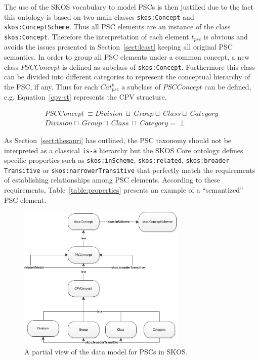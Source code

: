 \begin{itemize}
 The use of the SKOS vocabulary to model PSCs is then justified due to the fact this ontology is based on two 
 main classes \texttt{skos:Concept} and \texttt{skos:ConceptScheme}. Thus all PSC elements are 
 an instance of the class \texttt{skos:Concept}. Therefore the interpretation of each element $t_{psc}$ 
 is obvious and avoids the issues presented in Section~\ref{sect:least} keeping all original PSC semantics. In order 
 to group all PSC elements under a common concept, a new class $PSCConcept$ is defined as subclass of 
 \texttt{skos:Concept}. Furthermore this class can be divided into different categories to represent 
 the conceptual hierarchy of the PSC, if any. Thus for each $Cat_{psc}^k$ a subclass of $PSCConcept$ can be defined, e.g. 
 Equation~\ref{cpv-st} represents the CPV structure.
 
 \begin{equation}\label{cpv-st}
 \begin{split}
 PSCConcept\ \equiv Division\ \sqcup\ Group \sqcup\ Class \sqcup\ Category \\
 Division \sqcap\ Group \sqcap\ Class\ \sqcap\ Category = \perp
 \end{split}
\end{equation}

  As Section~\ref{sect:thesauri} has outlined, the PSC taxonomy should not be interpreted as a classical \texttt{is-a} hierarchy but 
  the SKOS Core ontology defines specific properties such as \texttt{skos:inScheme}, \texttt{skos:related}, \texttt{skos:broader Transitive} or
  \texttt{skos:narrowerTransitive} that perfectly match the requirements of establishing relationships among PSC elements. According to 
  these requirements, Table~\ref{table:properties} presents an example of a ``semantized'' PSC element. 
  
 \begin{figure}[!ht]
\centering
	\includegraphics[width=8cm]{./imgs/fig-2}
 \caption{A partial view of the data model for PSCs in SKOS.}
 \label{fig:pscs-data-model}
\end{figure}


\end{itemize}
